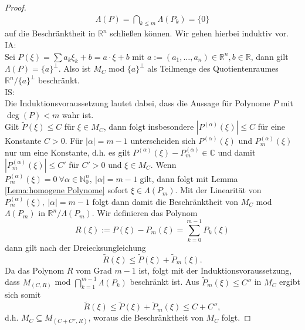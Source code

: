 \begin{proof}
\begin{align*}
\Lambda(P) = \bigcap_{k \leq m} \Lambda (P_k) = \{0\}
\end{align*}
auf die Beschränktheit in $\mathbb{R}^n$ schließen können. Wir gehen hierbei induktiv vor.
\\IA: 
\\Sei $P(\xi) = \sum a_k \xi_k + b = a \cdot \xi + b$ mit $ a := (a_1, \ldots , a_n) \in \mathbb{R}^n , b \in \mathbb{R}$, dann gilt $\Lambda(P)=\{a\}^{\bot}$. Also ist $M_C$ mod $\{a\}^{\bot}$ als Teilmenge des Quotientenraumes $\mathbb{R}^n/\{a\}^{\bot}$ beschränkt.
\\IS:
\\Die Induktionsvoraussetzung lautet dabei, dass die Aussage für Polynome $P$ mit $\deg(P)<m$ wahr ist.
\\Gilt $\widetilde{P}(\xi) \leq C$ für $\xi \in M_C$, dann folgt insbesondere $|P^{(\alpha)}(\xi)|\leq C$ für eine Konstante $C>0$. Für $|\alpha|=m-1$ unterscheiden sich $P^{(\alpha)}(\xi)$ und $P_m^{(\alpha)}(\xi)$ nur um eine Konstante, d.h. es gilt $P^{(\alpha)}(\xi)-P_m^{(\alpha)}\in\mathbb{C}$ und damit $|P_m^{(\alpha)}(\xi)| \leq C'$ für $C'>0$ und $\xi \in M_C$. Wenn $P_m^{(\alpha)}(\xi)=0 \ \forall \alpha \in \mathbb{N}_0^n, \ |\alpha|=m-1$ gilt, dann folgt mit Lemma \ref{Lema:homogene Polynome} sofort $\xi \in \Lambda(P_m)$. Mit der Linearität von $P_m^{(\alpha)}(\xi), \ |\alpha|=m-1$ folgt  dann damit die Beschränktheit von $M_C$ mod $\Lambda(P_m)$ in $\mathbb{R}^n/\Lambda(P_m)$. Wir definieren das Polynom
\begin{equation}
R(\xi):=P(\xi) - P_m(\xi) = \sum_{k=0}^{m-1} P_k(\xi)
\end{equation}
dann gilt nach der Dreiecksungleichung
\begin{equation}
\widetilde{R}(\xi) \leq \widetilde{P}(\xi) + \widetilde{P}_m(\xi).
\end{equation}
Da das Polynom $R$ vom Grad $m-1$ ist, folgt mit der Induktionsvoraussetzung, dass $M_{(C,R)}$ mod $\bigcap_{k=1}^{m-1} \Lambda (P_k)$ beschränkt ist. Aus $\widetilde{P}_m(\xi) \leq C''$ in $M_C$ ergibt sich somit
\begin{equation}
\widetilde{R}(\xi) \leq \widetilde{P}(\xi) + \widetilde{P}_m(\xi) \leq C + C'',
\end{equation}
d.h. $M_C \subseteq M_{(C+C'',R)}$, woraus die Beschränktheit von $M_C$ folgt.
\end{proof}



